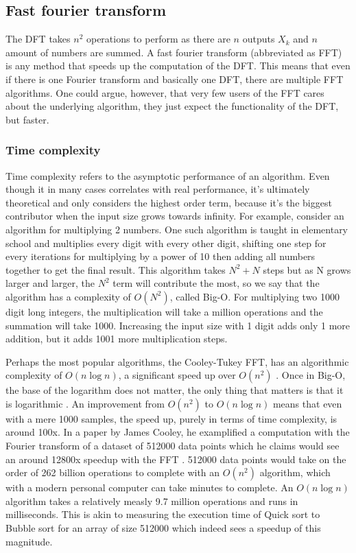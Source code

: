 \subsection{Fast fourier transform}
The DFT takes $n^2$ operations to perform as there are $n$ outputs $X_k$ and $n$ amount of numbers are summed. A fast fourier transform (abbreviated as FFT) is any method that speeds up the computation of the DFT. This means that even if there is one Fourier transform and basically one DFT, there are multiple FFT algorithms. One could argue, however, that very few users of the FFT cares about the underlying algorithm, they just expect the functionality of the DFT, but faster. 

\subsubsection{Time complexity}
Time complexity refers to the asymptotic performance of an algorithm. Even though it in many cases correlates with real performance, it's ultimately theoretical and only considers the highest order term, because it's the biggest contributor when the input size grows towards infinity. For example, consider an algorithm for multiplying 2 numbers. One such algorithm is taught in elementary school and multiplies every digit with every other digit, shifting one step for every iterations for multiplying by a power of 10 then adding all numbers together to get the final result. This algorithm takes $N^2+N$ steps but as N grows larger and larger, the $N^2$ term will contribute the most, so we say that the algorithm has a complexity of $O(N^2)$, called Big-O. For multiplying two 1000 digit long integers, the multiplication will take a million operations and the summation will take 1000. Increasing the input size with 1 digit adds only 1 more addition, but it adds 1001 more multiplication steps.

Perhaps the most popular algorithms, the Cooley-Tukey FFT, has an algorithmic complexity of $O(n \log n)$, a significant speed up over $O(n^2)$ \cite{Randhawa2018} \cite{HeidemanEtAl1984}. Once in Big-O, the base of the logarithm does not matter, the only thing that matters is that it is logarithmic . An improvement from $O(n^2)$ to $O(n \log n)$ means that even with a mere 1000 samples, the speed up, purely in terms of time complexity, is around 100x. In a paper by James Cooley, he examplified a computation with the Fourier transform of a dataset of 512000 data points which he claims would see an around 12800x speedup with the FFT \cite{Cooley1987}. 512000 data points would take on the order of 262 billion operations to complete with an $O(n^2)$ algorithm, which with a modern personal computer can take minutes to complete. An $O(n \log n)$ algorithm takes a relatively measly 9.7 million operations and runs in milliseconds. This is akin to measuring the execution time of Quick sort to Bubble sort for an array of size 512000 which indeed sees a speedup of this magnitude.

